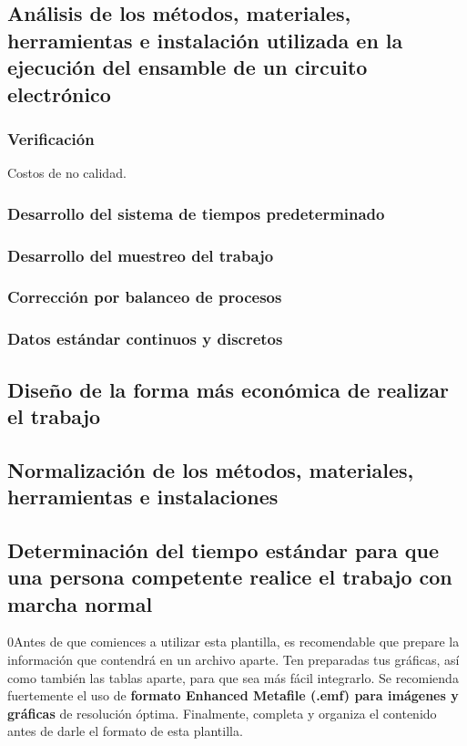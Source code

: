     \subsection{Análisis de los métodos, materiales, herramientas e instalación utilizada en la ejecución del ensamble de un circuito electrónico}
    
    \subsubsection{Verificación}
    
    Costos de no calidad.
    \subsubsection{Desarrollo del sistema de tiempos predeterminado}
    \subsubsection{Desarrollo del muestreo del trabajo}
    \subsubsection{Corrección por balanceo de procesos}
    \subsubsection{Datos estándar continuos y discretos}
    \subsection{Diseño de la forma más económica de realizar el trabajo}
    
    \subsection{Normalización de los métodos, materiales, herramientas e instalaciones}
    
    \subsection{Determinación del tiempo estándar para que una persona competente realice el trabajo con marcha normal}
    
    
    0Antes de que comiences a utilizar esta plantilla, es recomendable que prepare la información que contendrá en un archivo aparte. 
    Ten preparadas tus gráficas, así como también las tablas aparte, para que sea más fácil integrarlo. 
    Se recomienda fuertemente el uso de \textbf{formato Enhanced Metafile (.emf) para imágenes y gráficas} de resolución óptima. 
    Finalmente, completa y organiza el contenido antes de darle el formato de esta plantilla. 
    
